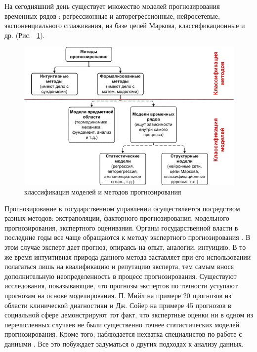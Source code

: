 На сегодняшний день существует множество моделей прогнозирования временных рядов \cite{Chuchueva2012}: регрессионные и авторегрессионные, 
нейросетевые, экспоненциального сглаживания, на базе цепей Маркова, классификационные и др. (Рис. ~\ref{figure:mod_classifier}).
\begin{figure}[bhtp]
    \centering
    \includegraphics[width=\textwidth, keepaspectratio]{images/mod_classifier.png}
    \caption{классификация моделей и методов прогнозирования \cite{Chuchueva13habr}}
    \label{figure:mod_classifier}
\end{figure}
Прогнозирование в государственном управлении осуществляется посредством разных методов: экстраполяции, факторного прогнозирования, 
модельного прогнозирования, экспертного оценивания. 
Органы государственной власти в последние годы все чаще обращаются к методу экспертного прогнозирования \cite{Gegedush2008}. 
В этом случае эксперт дает прогноз, опираясь на опыт, аналогии, интуицию. 
В то же время интуитивная природа данного метода заставляет при его использовании полагаться лишь на квалификацию и репутацию эксперта, 
тем самым внося дополнительную неопределенность в процесс прогнозирования. 
Существуют исследования, показывающие, что прогнозы экспертов по точности уступают прогнозам на основе моделирования. 
П. Мийл на примере 20 прогнозов из области клинической диагностики \cite{MeehlClinStat} 
и Дж. Сойер на примере 45 прогнозов в социальной сфере \cite{Sawyer1966} демонстрируют тот факт, 
что экспертные оценки ни в одном из перечисленных случаев не были существенно точнее статистических моделей прогнозирования. 
Кроме того, наблюдается нехватка специалистов по работе с данными \cite{Davenport2012}. 
Все это побуждает задуматься о других подходах к анализу данных. 

